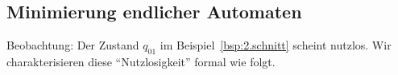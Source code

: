 \goodbreak





\subsection{Minimierung endlicher Automaten}

% 
% 

Beobachtung: Der Zustand $q_{01}$ im Beispiel~\ref{bsp:2.schnitt} scheint nutzlos. Wir charakterisieren diese "`Nutzlosigkeit"' formal wie folgt.

